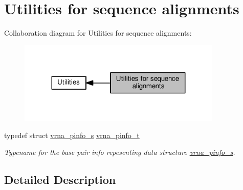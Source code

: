 \hypertarget{group__aln__utils}{}\section{Utilities for sequence alignments}
\label{group__aln__utils}
Collaboration diagram for Utilities for sequence alignments\+:
\nopagebreak
\begin{figure}[H]
\begin{center}
\leavevmode
\includegraphics[width=275pt]{group__aln__utils}
\end{center}
\end{figure}
\begin{DoxyCompactItemize}
\item 
typedef struct \hyperlink{structvrna__pinfo__s}{vrna\+\_\+pinfo\+\_\+s} \hyperlink{group__aln__utils_ga6660dfca23debee7306e0cd53341263f}{vrna\+\_\+pinfo\+\_\+t}\hypertarget{group__aln__utils_ga6660dfca23debee7306e0cd53341263f}{}\label{group__aln__utils_ga6660dfca23debee7306e0cd53341263f}

\begin{DoxyCompactList}\small\item\em Typename for the base pair info repesenting data structure \hyperlink{structvrna__pinfo__s}{vrna\+\_\+pinfo\+\_\+s}. \end{DoxyCompactList}\end{DoxyCompactItemize}


\subsection{Detailed Description}
